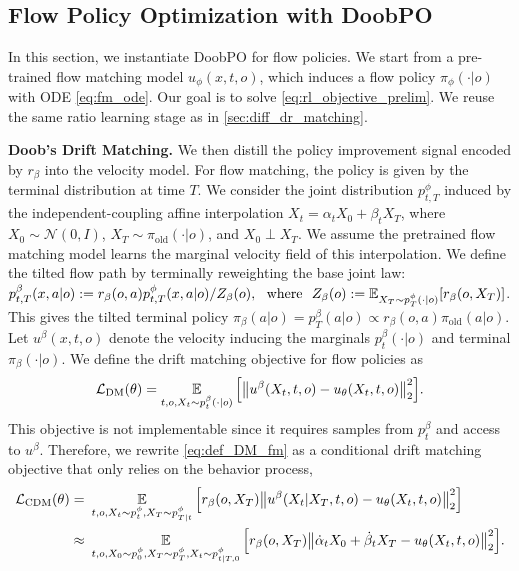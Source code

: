 \subsection{Flow Policy Optimization with DoobPO}
\label{sec:flow_dr_matching}

In this section, we instantiate DoobPO for flow policies.
We start from a pre-trained flow matching model $u_\phi(x,t,o)$, which induces a flow policy $\pi_\phi(\cdot|o)$ with ODE \eqref{eq:fm_ode}.
Our goal is to solve \eqref{eq:rl_objective_prelim}.
We reuse the same ratio learning stage as in \cref{sec:diff_dr_matching}.

\textbf{Doob's Drift Matching.}
We then distill the policy improvement signal encoded by $r_\beta$ into the velocity model.
For flow matching, the policy is given by the terminal distribution at time $T$.
We consider the joint distribution $p_{t,T}^\phi$
induced by the independent-coupling affine interpolation
$X_t=\alpha_t X_0+\beta_t X_T$, where
$X_0\sim\mathcal N(0,I)$,
$X_T\sim\pi_{\mathrm{old}}(\cdot|o)$,
and $X_0\perp X_T$.
We assume the pretrained flow matching model
learns the marginal velocity field of
this interpolation.
We define the tilted flow path by terminally reweighting the base joint law:
$p_{t,T}^\beta(x,a|o)
:=
    {
        r_\beta(o,a)
        p_{t,T}^\phi(x,a|o)
    }/{
        Z_{\beta}(o)
    },
    ~~ \text{where} ~~
    Z_{\beta}(o):=
    \operatorname*{{\mathbb{E}}}_{X_T\sim p_T^\phi(\cdot|o)}
    [
        r_\beta(o,X_T)
    ]$.
This gives the tilted terminal policy
$\pi_\beta(a|o)=p_T^\beta(a|o)\propto r_\beta(o,a)\pi_{\mathrm{old}}(a|o)$.
Let $u^\beta(x,t,o)$ denote the velocity inducing the marginals $p_t^\beta(\cdot|o)$ and terminal $\pi_\beta(\cdot|o)$.
We define the drift matching objective for flow policies as
\begin{align}
\label{eq:def_DM_fm}
    \mathcal{L}_{\mathrm{DM}}(\theta)
    =
    \operatorname*{{\mathbb{E}}}_{t,o, X_t \sim p_t^\beta(\cdot|o)}
    \Big[
        \big\|
            u^\beta(X_t,t,o)
            - u_\theta(X_t,t,o)
        \big\|_2^2
    \Big].
\end{align}
This objective is not implementable since it requires samples from $p_t^\beta$ and access to $u^\beta$.
Therefore, we rewrite \eqref{eq:def_DM_fm} as a conditional drift matching objective that only relies on the behavior process,
\begin{align}
\label{eq:def_cDM_fm}
    \mathcal{L}_{\mathrm{CDM}}(\theta)
    = & ~
    \operatorname*{{\mathbb{E}}}_{t,o, X_t \sim p_t^\phi, X_T \sim p_{T| t}^\phi}
    \Big[
        r_\beta(o,X_T)
        \big\|
            u^\beta(X_t| X_T,t,o)
            - u_\theta(X_t,t,o)
        \big\|_2^2
    \Big] \\
    \approx &~
    \operatorname*{{\mathbb{E}}}_{t,o, X_0 \sim p_0^\phi, X_T \sim p_T^\phi, X_t \sim p_{t|T,0}^\phi}
    \Big[
        r_\beta(o,X_T)
        \big\|
            \dot{\alpha}_t X_0 + \dot{\beta}_t X_T
            - u_\theta(X_t,t,o)
        \big\|_2^2
    \Big].
    \nonumber
\end{align}
